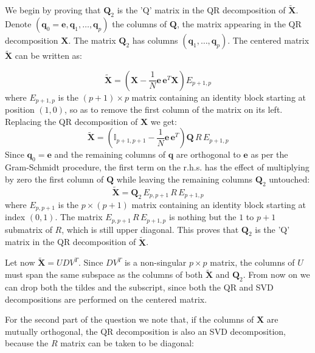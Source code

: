 

We begin by proving that $\mathbf{Q}_2$ is the 'Q' matrix in
the QR decomposition of $\tilde{\mathbf{X}}$.
Denote $(\mathbf{q}_0 = \mathbf{e}, \mathbf{q}_1, \ldots, \mathbf{q}_p)$ the 
columns of $\mathbf{Q}$, the matrix appearing in the QR decomposition $\mathbf{X}$. The matrix $\mathbf{Q}_2$ has columns $(\mathbf{q}_1, \ldots, 
\mathbf{q}_{p})$. The centered matrix $\tilde{\mathbf{X}}$ can be written as:

\begin{equation}
\tilde{\mathbf{X}} = \left(\mathbf{X} - \frac{1}{N} \mathbf{e}\, \mathbf{e}^T\mathbf{X}\right) E_{p+1, p}
\end{equation}
where $E_{p + 1, p}$ is the $(p + 1) \times p$ matrix containing
an identity block starting at position $(1, 0)$, so as to remove
the first column of the matrix on its left.
Replacing the QR decomposition of $\mathbf{X}$ we get:
\begin{equation}
\tilde{\mathbf{X}} = \left(\mathbb{I}_{p+1, p + 1} - \frac{1}{N} \mathbf{e}\,\mathbf{e}^T\right) \mathbf{Q}\,R\, E_{p+1, p}
\end{equation}
Since $\mathbf{q}_0 = \mathbf{e}$ and the remaining columns of $\mathbf{q}$
are orthogonal to $\mathbf{e}$ as per the Gram-Schmidt procedure, the first
term on the r.h.s. has the effect of multiplying by zero the first column of
$\mathbf{Q}$ while leaving the remaining columns $\mathbf{Q}_2$ untouched:
\begin{equation}
\tilde{\mathbf{X}} = \mathbf{Q}_2\, E_{p, p+1} \,R\, E_{p+1, p}
\end{equation}
where $E_{p, p+1}$ is the $p \times (p + 1)$ matrix containing an identity
block starting at index $(0, 1)$. The matrix $E_{p, p+1} \,R\, E_{p+1, p}$
is nothing but the $1$ to $p + 1$ submatrix of $R$, which is still upper diagonal.
This proves that $\mathbf{Q}_2$ is the 'Q' matrix in the QR decomposition of
$\tilde{\mathbf{X}}$.

Let now $\tilde{\mathbf{X}} = UDV^T$. Since $DV^T$ is a non-singular $p \times p$
matrix, the columns of $U$ must span the same subspace as the columns of both
$\tilde{\mathbf{X}}$ and $\mathbf{Q}_2$. From now on we can drop both the tildes
and the subscript, since both the QR and SVD decompositions are performed
on the centered matrix.

For the second part of the question we note that, if the columns of 
$\mathbf{X}$ are mutually orthogonal, the QR decomposition is also
an SVD decomposition, because the $R$ matrix can be taken to be diagonal:

